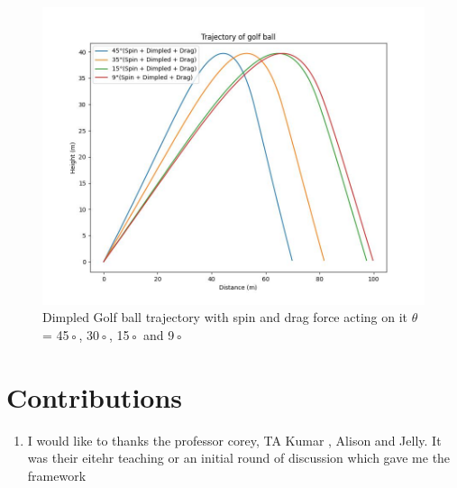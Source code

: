 \documentclass[11pt]{article}
\begin{document}
\begin{figure}[b]
    \centering
    \includegraphics[width=\textwidth, height=\textheight, keepaspectratio]{Golf_Trajectory_Spin_Dimpled_drag.jpeg}
    \caption{Dimpled Golf ball trajectory with spin and drag force acting on it $\theta$ = 45◦, 30◦, 15◦ and 9◦}
    \label{fig:Spin_Dimpled_Fdrag_trajectory}
\end{figure}

\section{Contributions}
\begin{enumerate}
    \item I would like to thanks the professor corey, TA Kumar , Alison and Jelly. It was their eitehr teaching or an initial round of discussion which gave me the framework
\end{enumerate}

  
\end{document}
